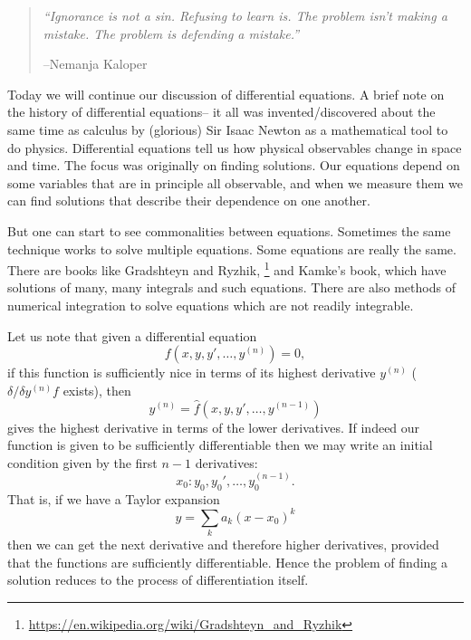 \begin{quote}
    \textit{``Ignorance is not a sin. Refusing to learn is. The problem isn't making a mistake. The problem is defending a mistake.''}
    
    --Nemanja Kaloper
\end{quote}

Today we will continue our discussion of differential equations. A brief note on the history of differential equations-- it all was invented/discovered about the same time as calculus by (glorious) Sir Isaac Newton as a mathematical tool to do physics.
Differential equations tell us how physical observables change in space and time. The focus was originally on finding solutions. Our equations depend on some variables that are in principle all observable, and when we measure them we can find solutions that describe their dependence on one another.

But one can start to see commonalities between equations. Sometimes the same technique works to solve multiple equations. Some equations are really the same. There are books like Gradshteyn and Ryzhik,%
    \footnote{\url{https://en.wikipedia.org/wiki/Gradshteyn_and_Ryzhik}}
and Kamke's book, which have solutions of many, many integrals and such equations. There are also methods of numerical integration to solve equations which are not readily integrable.

Let us note that given a differential equation
\begin{equation}
    f(x,y,y',\ldots, y^{(n)})=0,
\end{equation}
if this function is sufficiently nice in terms of its highest derivative $y^{(n)}$ ($\delta/\delta y^{(n)} f$ exists), then
\begin{equation}
    y^{(n)} =\hat f(x,y, y', \ldots, y^{(n-1)})
\end{equation}
gives the highest derivative in terms of the lower derivatives. If indeed our function is given to be sufficiently differentiable then we may write an initial condition given by the first $n-1$ derivatives:
\begin{equation}
    x_0: y_0, y_0', \ldots, y_0^{(n-1)}.
\end{equation}
That is, if we have a Taylor expansion
\begin{equation}
    y= \sum_k a_k(x-x_0)^k
\end{equation}
then we can get the next derivative and therefore higher derivatives, provided that the functions are sufficiently differentiable. Hence the problem of finding a solution reduces to the process of differentiation itself.

